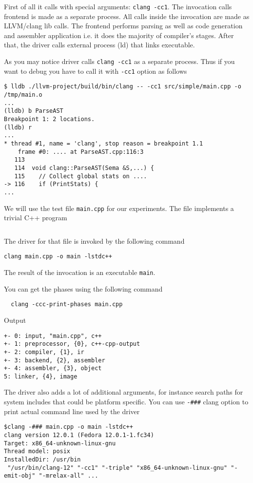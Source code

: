 First of all it calls \clang with special arguments: \texttt{clang
  -cc1}. The invocation calls \clang frontend is made as a separate process. All
calls inside the invocation are made as LLVM/clang lib calls. The frontend
performs parsing as well as code generation and assembler application i.e. it
does the majority of compiler's stages. After that, the driver calls external
process (ld) that links executable.

As you may notice \clang driver calls \texttt{clang -cc1} as a
separate process. Thus if you want to debug \clang you have to call it with
\texttt{-cc1} option as follows
\begin{verbatim}
$ lldb ./llvm-project/build/bin/clang -- -cc1 src/simple/main.cpp -o /tmp/main.o
...
(lldb) b ParseAST
Breakpoint 1: 2 locations.
(lldb) r
...
* thread #1, name = 'clang', stop reason = breakpoint 1.1
    frame #0: .... at ParseAST.cpp:116:3
   113  
   114  void clang::ParseAST(Sema &S,...) {
   115    // Collect global stats on ....
-> 116    if (PrintStats) {
...
\end{verbatim}


We will use the test file \texttt{main.cpp} for our experiments. The
file implements a trivial C++ program
\inputminted{c++}{./src/simple/main.cpp}

The driver for that file is invoked by the following command
\begin{verbatim}
clang main.cpp -o main -lstdc++
\end{verbatim}
The result of the invocation is an executable \texttt{main}. 

You can get the phases using the following command
\begin{verbatim}
  clang -ccc-print-phases main.cpp
\end{verbatim}

Output
\begin{verbatim}
+- 0: input, "main.cpp", c++
+- 1: preprocessor, {0}, c++-cpp-output
+- 2: compiler, {1}, ir
+- 3: backend, {2}, assembler
+- 4: assembler, {3}, object
5: linker, {4}, image
\end{verbatim}

The driver also adds a lot of additional arguments, for instance
search paths for system includes that could be platform specific.
You can use \texttt{-###} clang option to print actual
command line used by the driver
\begin{verbatim}
$clang -### main.cpp -o main -lstdc++
clang version 12.0.1 (Fedora 12.0.1-1.fc34)
Target: x86_64-unknown-linux-gnu
Thread model: posix
InstalledDir: /usr/bin
 "/usr/bin/clang-12" "-cc1" "-triple" "x86_64-unknown-linux-gnu" "-emit-obj" "-mrelax-all" ...
\end{verbatim}

